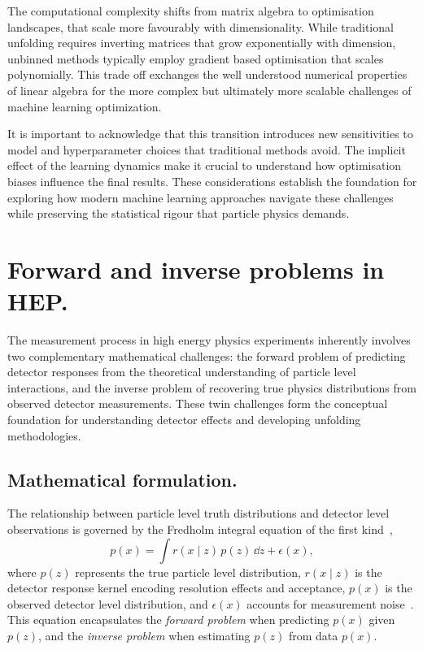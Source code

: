         The computational complexity shifts from matrix algebra to optimisation landscapes, that scale more favourably with dimensionality.
        While traditional unfolding requires inverting matrices that grow exponentially with dimension, unbinned methods typically employ gradient based optimisation that scales polynomially.
        This trade off exchanges the well understood numerical properties of linear algebra for the more complex but ultimately more scalable challenges of machine learning optimization.

        It is important to acknowledge that this transition introduces new sensitivities to model and hyperparameter choices that traditional methods avoid.
        The implicit effect of the learning dynamics make it crucial to understand how optimisation biases influence the final results.
        These considerations establish the foundation for exploring how modern machine learning approaches navigate these challenges while preserving the statistical rigour that particle physics demands.

\section{Forward and inverse problems in HEP.}
    The measurement process in high energy physics experiments inherently involves two complementary mathematical challenges: the forward problem of predicting detector responses from the theoretical understanding of particle level interactions, and the inverse problem of recovering true physics distributions from observed detector measurements.
    These twin challenges form the conceptual foundation for understanding detector effects and developing unfolding methodologies.

\subsection{Mathematical formulation.}

The relationship between particle level truth distributions and detector level observations is governed by the Fredholm integral equation of the first kind~\cite{fredholm_sur_1903},
%
\begin{equation}
    p(x) = \int r(x\mid z)\,p(z) \, \dd z + \epsilon(x),
\end{equation}
where \(p(z)\) represents the true particle level distribution, \(r(x\mid z)\) is the detector response kernel encoding resolution effects and acceptance, \(p(x)\) is the observed detector level distribution, and \(\epsilon(x)\) accounts for measurement noise~\cite{weinberg_elementary_1963}.
%
This equation encapsulates the \emph{forward problem} when predicting \(p(x)\) given \(p(z)\), and the \textit{inverse problem} when estimating \(p(z)\) from data \(p(x)\).

